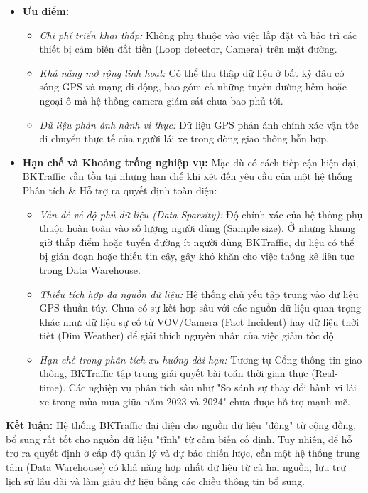 \begin{itemize}
    \item \textbf{Ưu điểm:}
    \begin{itemize}
        \item \textit{Chi phí triển khai thấp:} Không phụ thuộc vào việc lắp đặt và bảo trì các thiết bị cảm biến đắt tiền (Loop detector, Camera) trên mặt đường.
        \item \textit{Khả năng mở rộng linh hoạt:} Có thể thu thập dữ liệu ở bất kỳ đâu có sóng GPS và mạng di động, bao gồm cả những tuyến đường hẻm hoặc ngoại ô mà hệ thống camera giám sát chưa bao phủ tới.
        \item \textit{Dữ liệu phản ánh hành vi thực:} Dữ liệu GPS phản ánh chính xác vận tốc di chuyển thực tế của người lái xe trong dòng giao thông hỗn hợp.
    \end{itemize}

    \item \textbf{Hạn chế và Khoảng trống nghiệp vụ:} Mặc dù có cách tiếp cận hiện đại, BKTraffic vẫn tồn tại những hạn chế khi xét đến yêu cầu của một hệ thống Phân tích \& Hỗ trợ ra quyết định toàn diện:
    \begin{itemize}
        \item \textit{Vấn đề về độ phủ dữ liệu (Data Sparsity):} Độ chính xác của hệ thống phụ thuộc hoàn toàn vào số lượng người dùng (Sample size). Ở những khung giờ thấp điểm hoặc tuyến đường ít người dùng BKTraffic, dữ liệu có thể bị gián đoạn hoặc thiếu tin cậy, gây khó khăn cho việc thống kê liên tục trong Data Warehouse.
        \item \textit{Thiếu tích hợp đa nguồn dữ liệu:} Hệ thống chủ yếu tập trung vào dữ liệu GPS thuần túy. Chưa có sự kết hợp sâu với các nguồn dữ liệu quan trọng khác như: dữ liệu sự cố từ VOV/Camera (Fact Incident) hay dữ liệu thời tiết (Dim Weather) để giải thích nguyên nhân của việc giảm tốc độ.
        \item \textit{Hạn chế trong phân tích xu hướng dài hạn:} Tương tự Cổng thông tin giao thông, BKTraffic tập trung giải quyết bài toán thời gian thực (Real-time). Các nghiệp vụ phân tích sâu như "So sánh sự thay đổi hành vi lái xe trong mùa mưa giữa năm 2023 và 2024" chưa được hỗ trợ mạnh mẽ.
    \end{itemize}
\end{itemize}

\textbf{Kết luận:} Hệ thống BKTraffic đại diện cho nguồn dữ liệu "động" từ cộng đồng, bổ sung rất tốt cho nguồn dữ liệu "tĩnh" từ cảm biến cố định. Tuy nhiên, để hỗ trợ ra quyết định ở cấp độ quản lý và dự báo chiến lược, cần một hệ thống trung tâm (Data Warehouse) có khả năng hợp nhất dữ liệu từ cả hai nguồn, lưu trữ lịch sử lâu dài và làm giàu dữ liệu bằng các chiều thông tin bổ sung.

